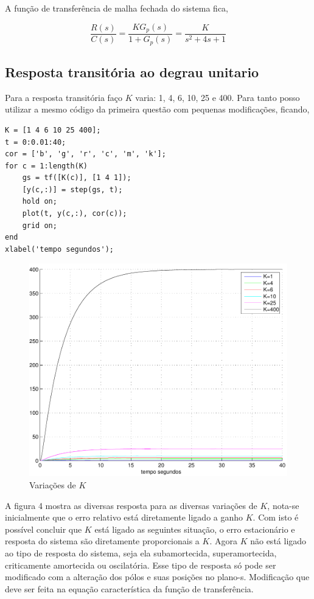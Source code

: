 \documentclass[paper=a4, fontsize=11pt]{article}
\begin{document}
A função de transferência de malha fechada do sistema fica,

\begin{equation}
    \frac{R(s)}{C(s)} = \frac{K G_p(s)}{1 + G_p(s)} = \frac{K}{s^2 + 4 s + 1}
\end{equation}

\subsection{Resposta transitória ao degrau unitario}

Para a resposta transitória faço $K$ varia: 1, 4, 6, 10, 25 e 400. Para tanto
posso utilizar a mesmo código da primeira questão com pequenas modificações, ficando,

\begin{lstlisting}
K = [1 4 6 10 25 400];
t = 0:0.01:40;
cor = ['b', 'g', 'r', 'c', 'm', 'k'];
for c = 1:length(K)
    gs = tf([K(c)], [1 4 1]);
    [y(c,:)] = step(gs, t);
    hold on;
    plot(t, y(c,:), cor(c));
    grid on;
end
xlabel('tempo segundos');
\end{lstlisting}


\begin{figure}
    \begin{center}
    \includegraphics[scale=.5]{q4ia.pdf}
    \caption{Variações de $K$}
    \end{center}
\end{figure}

A figura 4 mostra as diversas resposta para as diversas variações
de $K$, nota-se inicialmente que o erro relativo está diretamente ligado 
a ganho $K$. Com isto é possível concluir que $K$ está ligado as seguintes 
situação, o erro estacionário e resposta do sistema são diretamente proporcionais
a $K$. Agora $K$ não está ligado ao tipo de resposta do sistema, seja ela 
subamortecida, superamortecida, criticamente amortecida ou oscilatória. Esse
tipo de resposta só pode ser modificado com a alteração dos pólos e suas posições
no plano-s. Modificação que deve ser feita na equação característica da função 
de transferência. 
\end{document}
